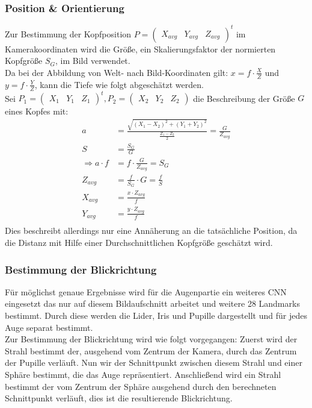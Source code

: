 \subsubsection{Position \& Orientierung}
\label{OpenFace_Pos_Ori}
Zur Bestimmung der Kopfposition $P= \begin{pmatrix}
X_{avg} & Y_{avg} & Z_{avg}
\end{pmatrix}^t$ im Kamerakoordinaten wird die Größe, ein Skalierungsfaktor der normierten Kopfgröße $S_G$, im Bild verwendet.\\
Da bei der Abbildung von Welt- nach Bild-Koordinaten gilt: $x=f\cdot \frac{X}{Z}$ und $ y=f\cdot \frac{Y}{Z}$, kann die Tiefe wie folgt abgeschätzt werden.\\
Sei $P_1 = \begin{pmatrix}
X_1&Y_1&Z_1
\end{pmatrix}^t, P_2= \begin{pmatrix}
X_2&Y_2&Z_2
\end{pmatrix}$ die Beschreibung der Größe $G$ eines Kopfes mit:\\
\begin{align*}
a &= \frac{\sqrt{(X_1-X_2)^2+(Y_1+Y_2)^2}}{\frac{Z_1-Z_2}{2}} =\frac{G}{Z_{avg}}\\
S &= \frac{S_G}{G}\\
\Rightarrow a\cdot f &= f\cdot\frac{G}{Z_{avg}} = S_G\\
Z_{avg} &= \frac{f}{S_G}\cdot G = \frac{f}{S}\\
X_{avg} &= \frac{x \cdot Z_{avg}}{f}\\
Y_{avg} &= \frac{y \cdot Z_{avg}}{f}\\
\end{align*}
Dies beschreibt allerdings nur eine Annäherung an die tatsächliche Position, da die Distanz mit Hilfe einer Durchschnittlichen Kopfgröße geschätzt wird.\\
\cite{OpenFace}
\subsubsection{Bestimmung der Blickrichtung}
\label{OpenFace_Blickrichtung}
Für möglichst genaue Ergebnisse wird für die Augenpartie ein weiteres CNN eingesetzt das nur auf diesem Bildaufschnitt arbeitet und weitere 28 Landmarks bestimmt. Durch diese werden die Lider, Iris und Pupille dargestellt und für jedes Auge separat bestimmt.\\
Zur Bestimmung der Blickrichtung wird wie folgt vorgegangen: Zuerst wird der Strahl bestimmt der, ausgehend vom Zentrum der Kamera, durch das Zentrum der Pupille verläuft. Nun wir der Schnittpunkt zwischen diesem Strahl und einer Sphäre bestimmt, die das Auge repräsentiert. Anschließend wird ein Strahl bestimmt der vom Zentrum der Sphäre ausgehend durch den berechneten Schnittpunkt verläuft, dies ist die resultierende Blickrichtung.
